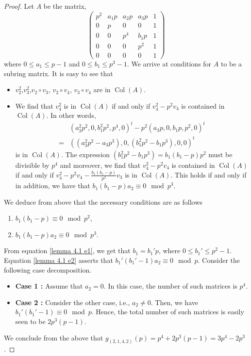 \documentclass[a4paper]{amsart}
\numberwithin{equation}{section}
\theoremstyle{remark}
\newcommand{\op}[1]{\operatorname{#1}}
\begin{document}
\begin{proof} Let $A$ be the matrix,
$$\begin{pmatrix}p^2 & a_1p & a_2p & a_3p & 1\\ 0 & p & 0 & 0 & 1\\
0 & 0 & p^4 & b_1p & 1\\
0 & 0 & 0 & p^2 & 1\\
0 & 0 & 0 & 0 & 1\end{pmatrix}$$
where $0 \leq a_1 \leq p-1$ and $0 \leq b_1 \leq p^3-1$.
We arrive at conditions for $A$ to be a subring matrix. It is easy to see that
\begin{itemize}
    \item $v_2^2$,$v_3^2$,$v_2\circ v_3$, $v_2\circ v_4$, $v_3\circ v_4$ are in $\op{Col}(A)$.
    \item We find that $v_4^2$ is in $\op{Col}(A)$ if and only if $v_4^2-p^2v_4$ is contained in $\op{Col}(A)$. In other words,
    \[\begin{split}& (a_3^2p^2,
    0,
    b_1^2p^2,
    p^4,
    0)^t - p^2(a_3p,
    0,
    b_1p,
    p^2,
    0)^t \\ =& \left((a_3^2p^2-a_3p^3), 0, (b_1^2p^2-b_1p^3),0,0\right)^t\end{split}\] is in $\op{Col}(A)$. The expression $(b_1^2p^2-b_1p^3)=b_1(b_1-p)p^2$ must be divisible by $p^4$ and moreover, we find that $v_4^2-p^2v_4$ is contained in $\op{Col}(A)$ if and only if $v_4^2-p^2v_4-\frac{b_1(b_1-p)}{p^2}v_3$ is in $\op{Col}(A)$. This holds if and only if in addition, we have that $b_1(b_1-p)a_2 \equiv 0 \mod p^3$.

\end{itemize}
We deduce from above that the necessary conditions are as follows
\begin{enumerate}
    \item\label{lemma 4.1 e1} $b_1(b_1-p) \equiv 0 \mod p^2$,
    \item\label{lemma 4.1 e2} $b_1(b_1-p)a_2 \equiv 0 \mod p^3$.
\end{enumerate}
From equation \eqref{lemma 4.1 e1}, we get that $b_1 = b_1'p$, where $0 \leq b_1' \leq p^2-1$. Equation \eqref{lemma 4.1 e2} asserts that $b_1'(b_1'-1)a_2 \equiv 0 \mod p$. Consider the following case decomposition.
\begin{itemize}
    \item \textbf{Case 1 :} Assume that $a_2 = 0$. In this case, the number of such matrices is $p^4$.
    \item \textbf{Case 2 :} Consider the other case, i.e., $a_2\neq 0$. Then, we have $b_1'(b_1'-1) \equiv 0 \mod p$. Hence, the total number of such matrices is easily seen to be $2p^3(p-1)$.
\end{itemize}
We conclude from the above that $g_{(2,1,4,2)}(p) = p^4+2p^3(p-1)=3p^4-2p^3$.
\end{proof}
\end{document}
